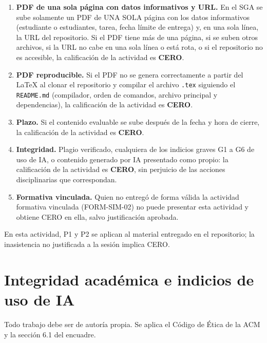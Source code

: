 \documentclass[11pt]{article}
\newcommand{\seccion}[1]{\section{\textcolor{utegreendk}{#1}}}
\begin{document}
\begin{cajapiso}[title={Criterios de piso: su incumplimiento implica calificación CERO en la actividad}]
	\begin{enumerate}[label=\textbf{P\arabic*.},leftmargin=24pt,itemsep=3pt]
		\item \textbf{PDF de una sola página con datos informativos y URL.} En el SGA se sube solamente un PDF de UNA SOLA página con los datos informativos (estudiante o estudiantes, tarea, fecha límite de entrega) y, en una sola línea, la URL del repositorio. Si el PDF tiene más de una página, si se suben otros archivos, si la URL no cabe en una sola línea o está rota, o si el repositorio no es accesible, la calificación de la actividad es \textbf{CERO}.
		\item \textbf{PDF reproducible.} Si el PDF no se genera correctamente a partir del \LaTeX{} al clonar el repositorio y compilar el archivo \texttt{.tex} siguiendo el \texttt{README.md} (compilador, orden de comandos, archivo principal y dependencias), la calificación de la actividad es \textbf{CERO}.
		\item \textbf{Plazo.} Si el contenido evaluable se sube después de la fecha y hora de cierre, la calificación de la actividad es \textbf{CERO}.
		\item \textbf{Integridad.} Plagio verificado, cualquiera de los indicios graves G1 a G6 de uso de IA, o contenido generado por IA presentado como propio: la calificación de la actividad es \textbf{CERO}, sin perjuicio de las acciones disciplinarias que correspondan.
		\item \textbf{Formativa vinculada.} Quien no entregó de forma válida la actividad formativa vinculada (FORM-SIM-02) no puede presentar esta actividad y obtiene CERO en ella, salvo justificación aprobada.
	\end{enumerate}
	En esta actividad, P1 y P2 se aplican al material entregado en el repositorio; la inasistencia no justificada a la sesión implica CERO.
\end{cajapiso}

\seccion{Integridad académica e indicios de uso de IA}

Todo trabajo debe ser de autoría propia. Se aplica el Código de Ética de la ACM \citep{acm_code_2018} y la sección 6.1 del encuadre.
\end{document}
